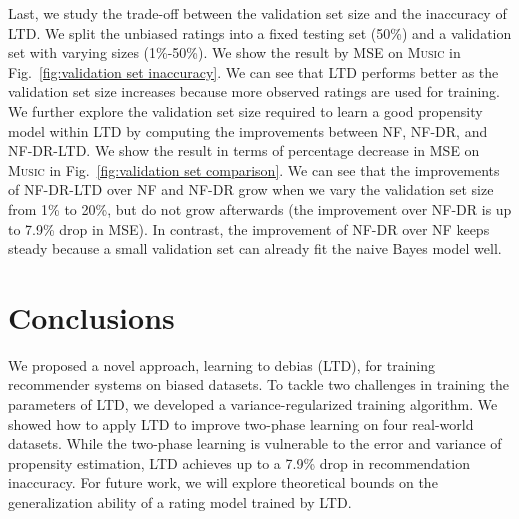 \documentclass[letterpaper]{article} %
\begin{document}
Last, we study the trade-off between the validation set size and the inaccuracy of LTD.
We split the unbiased ratings into a fixed testing set (50\%) and a validation set with varying sizes (1\%-50\%).
We show the result by MSE on \textsc{Music} in Fig.~\ref{fig:validation set inaccuracy}.
We can see that LTD performs better as the validation set size increases because more observed ratings are used for training.
We further explore the validation set size required to learn a good propensity model within LTD by computing the improvements between NF, NF-DR, and NF-DR-LTD.
We show the result in terms of percentage decrease in MSE on \textsc{Music} in Fig.~\ref{fig:validation set comparison}.
We can see that the improvements of NF-DR-LTD over NF and NF-DR grow when we vary the validation set size from 1\% to 20\%, but do not grow afterwards (the improvement over NF-DR is up to 7.9\% drop in MSE).
In contrast, the improvement of NF-DR over NF keeps steady because a small validation set can already fit the naive Bayes model well.

\section{Conclusions}
We proposed a novel approach, learning to debias (LTD), for training recommender systems on biased datasets.
To tackle two challenges in training the parameters of LTD, we developed a variance-regularized training algorithm.
We showed how to apply LTD to improve two-phase learning on four real-world datasets.
While the two-phase learning is vulnerable to the error and variance of propensity estimation, LTD achieves up to a 7.9\% drop in recommendation inaccuracy.
For future work, we will explore theoretical bounds on the generalization ability of a rating model trained by LTD.


{\clearpage}


\appendix
\end{document}
